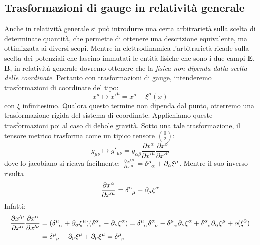\subsection{Trasformazioni di gauge in relatività generale}\label{para.gaugeGR}
Anche in relatività generale si può introdurre una certa arbitrarietà sulla scelta di determinate quantità, che permette di ottenere una descrizione equivalente, ma ottimizzata ai diversi scopi. Mentre in elettrodinamica l'arbitrarietà ricade sulla scelta dei potenziali che lascino immutati le entità fisiche che sono i due campi $\bm{E}$, $\bm{B}$, in relatività generale dovremo ottenere che la \emph{fisica non dipenda dalla scelta delle coordinate}. Pertanto con trasformazioni di gauge, intenderemo trasformazioni di coordinate del tipo:
\begin{equation*}
    x^\mu \mapsto x'^\mu = x^\mu + \xi^\mu(x)
\end{equation*}
con $\xi$ infinitesimo. Qualora questo termine non dipenda dal punto, otterremo una trasformazione rigida del sistema di coordinate. Applichiamo queste trasformazioni poi al caso di debole gravità. Sotto una tale trasformazione, il tensore metrico trasforma come un tipico tensore $\binom{0}{2}$:
\begin{equation*}
    g_{\mu\nu} \mapsto g'_{\mu\nu} = g_{\alpha\beta} \frac{\partial x^\alpha}{\partial x'^\mu} \frac{\partial x^\beta}{\partial x'^\nu}
\end{equation*}
dove lo jacobiano si ricava facilmente: $\frac{\partial x'^\mu}{\partial x^\alpha} = \tensor{\delta}{^\mu_\alpha} +\partial_\alpha \xi^\mu$. Mentre il suo inverso risulta
\begin{equation*}
    \frac{\partial x^\alpha}{\partial x'^\mu} = \tensor{\delta}{^\alpha_\mu} - \partial_\mu \xi^\alpha
\end{equation*}
Infatti:
\begin{align*}
    \frac{\partial x'^\mu}{\partial x^\alpha} \frac{\partial x^\alpha}{\partial x'^\nu} &= (\tensor{\delta}{^\mu_\alpha} +\partial_\alpha \xi^\mu)(\tensor{\delta}{^\alpha_\nu} -\partial_\nu \xi^\alpha)
    = \tensor{\delta}{^\mu_\alpha}\tensor{\delta}{^\alpha_\nu} - \tensor{\delta}{^\mu_\alpha}\partial_\nu \xi^\alpha + \tensor{\delta}{^\alpha_\nu}\partial_\alpha \xi^\mu +o(\xi^2)\\
    &= \tensor{\delta}{^\mu_\nu} - \partial_\nu \xi^\mu + \partial_\nu \xi^\mu = \tensor{\delta}{^\mu_\nu}
\end{align*}

